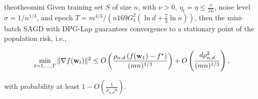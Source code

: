 \documentclass[11pt]{article}
\begin{document}

\begin{restatable}{theo}{theomini}
\label{thm: main_rmsprop_mini}
Given training set $S$ of size $n$, with $\nu >0$, $\eta_t = \eta \leq \frac{\nu}{2L}$, noise level $\sigma = 1/n^{1/3}$, and epoch $T = m^{4/3}/\left(n169G_1^2(\ln d + \frac{7}{3}\ln n)\right)$, then the mini-batch \textsc{SAGD} with DPG-Lap  guarantees convergence to a stationary point of the population risk, i.e., 
 \begin{small}
\begin{equation*}
\begin{split}
 \min_{t = 1,..., T}\|\nabla f(\mathbf{w}_t)\|^2 
 \leq O\left( \frac{\rho_{n,d} \left(f(\mathbf{w}_1) - f^\star \right)}{(mn)^{1/3}} \right)+ O \left( \frac{d \rho_{n,d}^2}{(mn)^{1/3}}\right),
 \end{split}
\end{equation*}
\end{small}
with probability at least $1-O\left(\frac{1}{\rho_{n,d} n}\right)$.
\end{restatable}
\end{document}
